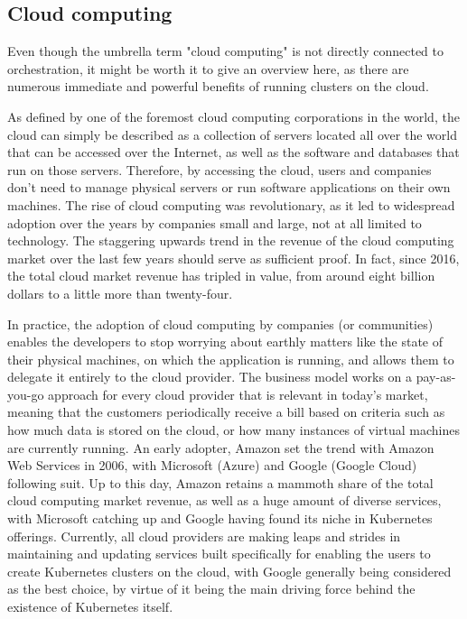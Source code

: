 \documentclass[thesis=B,english]{FITthesis}[2019/12/23]
\begin{document}
\subsection{Cloud computing}

Even though the umbrella term "cloud computing" is not directly connected to orchestration, it might be worth it to give an overview here, as there are numerous immediate and powerful benefits of running clusters on the cloud.

As defined by one of the foremost cloud computing corporations in the world, the cloud can simply be described as a collection of servers located all over the world that can be accessed over the Internet, as well as the software and databases that run on those servers. Therefore, by accessing the cloud, users and companies don't need to manage physical servers or run software applications on their own machines. \cite{cloudflare} The rise of cloud computing was revolutionary, as it led to widespread adoption over the years by companies small and large, not at all limited to technology. The staggering upwards trend in the revenue of the cloud computing market over the last few years should serve as sufficient proof. In fact, since 2016, the total cloud market revenue has tripled in value, from around eight billion dollars to a little more than twenty-four. \cite{cloud-market}

In practice, the adoption of cloud computing by companies (or communities) enables the developers to stop worrying about earthly matters like the state of their physical machines, on which the application is running, and allows them to delegate it entirely to the cloud provider. The business model works on a pay-as-you-go approach for every cloud provider that is relevant in today's market, meaning that the customers periodically receive a bill based on criteria such as how much data is stored on the cloud, or how many instances of virtual machines are currently running. \cite{aws-framework} An early adopter, Amazon set the trend with Amazon Web Services in 2006, with Microsoft (Azure) and Google (Google Cloud) following suit. Up to this day, Amazon retains a mammoth share of the total cloud computing market revenue, as well as a huge amount of diverse services, with Microsoft catching up and Google having found its niche in Kubernetes offerings. Currently, all cloud providers are making leaps and strides in maintaining and updating services built specifically for enabling the users to create Kubernetes clusters on the cloud, with Google generally being considered as the best choice, by virtue of it being the main driving force behind the existence of Kubernetes itself.
\end{document}
